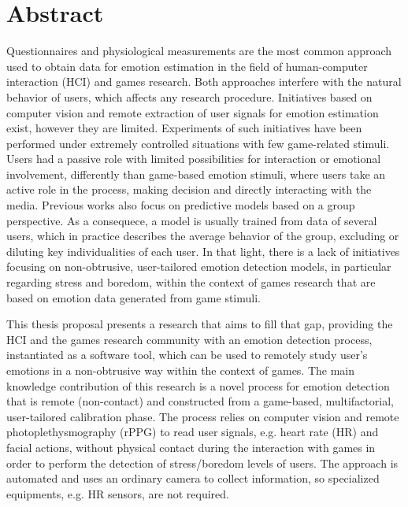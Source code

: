 \chapter*{Abstract}

Questionnaires and physiological measurements are the most common approach used to obtain data for emotion estimation in the field of human-computer interaction (HCI) and games research. Both approaches interfere with the natural behavior of users, which affects any research procedure. Initiatives based on computer vision and remote extraction of user signals for emotion estimation exist, however they are limited. Experiments of such initiatives have been performed under extremely controlled situations with few game-related stimuli. Users had a passive role with limited possibilities for interaction or emotional involvement, differently than game-based emotion stimuli, where users take an active role in the process, making decision and directly interacting with the media. Previous works also focus on predictive models based on a group perspective. As a consequece, a model is usually trained from data of several users, which in practice describes the average behavior of the group, excluding or diluting key individualities of each user. In that light, there is a lack of initiatives focusing on non-obtrusive, user-tailored emotion detection models, in particular regarding stress and boredom, within the context of games research that are based on emotion data generated from game stimuli.

This thesis proposal presents a research that aims to fill that gap, providing the HCI and the games research community with an emotion detection process, instantiated as a software tool, which can be used to remotely study user's emotions in a non-obtrusive way within the context of games. The main knowledge contribution of this research is a novel process for emotion detection that is remote (non-contact) and constructed from a game-based, multifactorial, user-tailored calibration phase. The process relies on computer vision and remote photoplethysmography (rPPG) to read user signals, e.g. heart rate (HR) and facial actions, without physical contact during the interaction with games in order to perform the detection of stress/boredom levels of users. The approach is automated and uses an ordinary camera to collect information, so specialized equipments, e.g. HR sensors, are not required.

